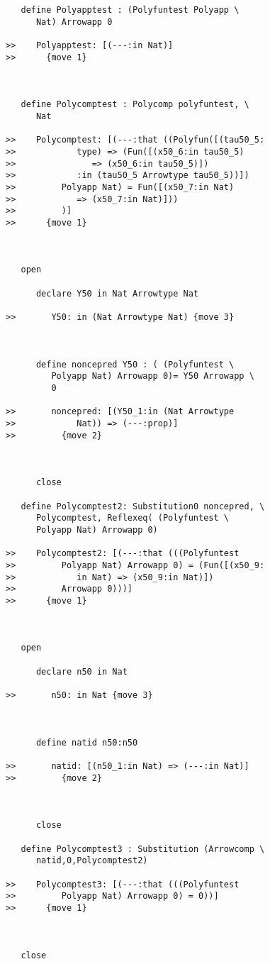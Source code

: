 \documentclass[12pt]{article}
\begin{document}
\begin{verbatim}
   define Polyapptest : (Polyfuntest Polyapp \
      Nat) Arrowapp 0

>>    Polyapptest: [(---:in Nat)]
>>      {move 1}



   define Polycomptest : Polycomp polyfuntest, \
      Nat

>>    Polycomptest: [(---:that ((Polyfun([(tau50_5:
>>            type) => (Fun([(x50_6:in tau50_5)
>>               => (x50_6:in tau50_5)])
>>            :in (tau50_5 Arrowtype tau50_5))])
>>         Polyapp Nat) = Fun([(x50_7:in Nat)
>>            => (x50_7:in Nat)]))
>>         )]
>>      {move 1}



   open

      declare Y50 in Nat Arrowtype Nat

>>       Y50: in (Nat Arrowtype Nat) {move 3}



      define noncepred Y50 : ( (Polyfuntest \
         Polyapp Nat) Arrowapp 0)= Y50 Arrowapp \
         0

>>       noncepred: [(Y50_1:in (Nat Arrowtype
>>            Nat)) => (---:prop)]
>>         {move 2}



      close

   define Polycomptest2: Substitution0 noncepred, \
      Polycomptest, Reflexeq( (Polyfuntest \
      Polyapp Nat) Arrowapp 0)

>>    Polycomptest2: [(---:that (((Polyfuntest
>>         Polyapp Nat) Arrowapp 0) = (Fun([(x50_9:
>>            in Nat) => (x50_9:in Nat)])
>>         Arrowapp 0)))]
>>      {move 1}



   open

      declare n50 in Nat

>>       n50: in Nat {move 3}



      define natid n50:n50

>>       natid: [(n50_1:in Nat) => (---:in Nat)]
>>         {move 2}



      close

   define Polycomptest3 : Substitution (Arrowcomp \
      natid,0,Polycomptest2)

>>    Polycomptest3: [(---:that (((Polyfuntest
>>         Polyapp Nat) Arrowapp 0) = 0))]
>>      {move 1}



   close
\end{verbatim}
\end{document}
